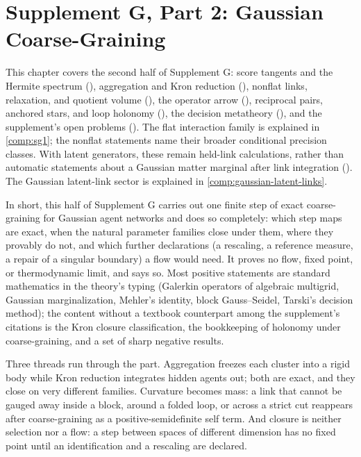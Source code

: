 \chapter{Supplement G, Part 2: Gaussian Coarse-Graining}
\label{comp:sg2}

This chapter covers the second half of Supplement G: score tangents and the Hermite spectrum
(), aggregation and Kron reduction (), nonflat
links, relaxation, and quotient volume (), the operator arrow
(), reciprocal pairs, anchored stars, and loop holonomy
(), the decision metatheory (), and the supplement's open
problems (). The flat interaction family is explained in \cref{comp:sg1};
the nonflat statements name their broader conditional precision classes. With latent generators,
these remain held-link calculations, rather than automatic statements about a Gaussian matter
marginal after link integration (). The Gaussian latent-link
sector is explained in \cref{comp:gaussian-latent-links}.

In short, this half of Supplement G carries out one finite step of exact coarse-graining for Gaussian agent
networks and does so completely: which step maps are exact, when the natural parameter families close under
them, where they provably do not, and which further declarations (a rescaling, a reference measure, a repair
of a singular boundary) a flow would need. It proves no flow, fixed point, or thermodynamic limit, and says
so. Most positive statements are standard mathematics in the theory's typing (Galerkin operators of algebraic
multigrid, Gaussian marginalization, Mehler's identity, block Gauss--Seidel, Tarski's decision method); the
content without a textbook counterpart among the supplement's citations is the Kron closure classification,
the bookkeeping of holonomy under coarse-graining, and a set of sharp negative results.

Three threads run through the part. Aggregation freezes each cluster into a rigid body while Kron reduction
integrates hidden agents out; both are exact, and they close on very different families. Curvature becomes
mass: a link that cannot be gauged away inside a block, around a folded loop, or across a strict cut reappears
after coarse-graining as a positive-semidefinite self term. And closure is neither selection nor a flow: a
step between spaces of different dimension has no fixed point until an identification and a rescaling are
declared.

